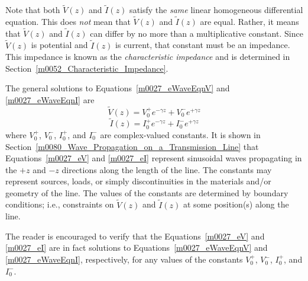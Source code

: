 Note that both $\widetilde{V}(z)$ and $\widetilde{I}(z)$ satisfy the \emph{same} linear homogeneous differential equation.
This does \emph{not} mean that $\widetilde{V}(z)$ and $\widetilde{I}(z)$ are equal.
Rather, it means that $\widetilde{V}(z)$ and $\widetilde{I}(z)$ can differ by no more than a multiplicative constant.
Since $\widetilde{V}(z)$ is potential and $\widetilde{I}(z)$ is current, that constant must be an impedance.
This impedance is known as the \emph{characteristic impedance} 
and is determined in Section~\ref{m0052_Characteristic_Impedance}.

The general solutions to Equations~\ref{m0027_eWaveEqnV} and \ref{m0027_eWaveEqnI} are
%
\begin{equation}
\widetilde{V}(z) = V_0^+ e^{-\gamma z} + V_0^- e^{+\gamma z}
\label{m0027_eV}
\end{equation}
%
\begin{equation}
\widetilde{I}(z) = I_0^+ e^{-\gamma z} + I_0^- e^{+\gamma z}
\label{m0027_eI}
\end{equation}
%
where $V_0^+$, $V_0^-$, $I_0^+$, and $I_0^-$ are complex-valued constants.
It is shown in Section~\ref{m0080_Wave_Propagation_on_a_Transmission_Line} that Equations~\ref{m0027_eV} and \ref{m0027_eI} represent sinusoidal waves propagating in the $+z$ and $-z$ directions along the length of the line.
The constants may represent sources, loads, or simply discontinuities in the materials and/or geometry of the line.
The values of the constants are determined by boundary conditions; i.e., constraints on $\widetilde{V}(z)$ and $\widetilde{I}(z)$ at some position(s) along the line.  

The reader is encouraged to verify that the Equations~\ref{m0027_eV} and \ref{m0027_eI} are in fact solutions to Equations~\ref{m0027_eWaveEqnV} and \ref{m0027_eWaveEqnI}, respectively, for any values of the constants $V_0^+$, $V_0^-$, $I_0^+$, and $I_0^-$.


